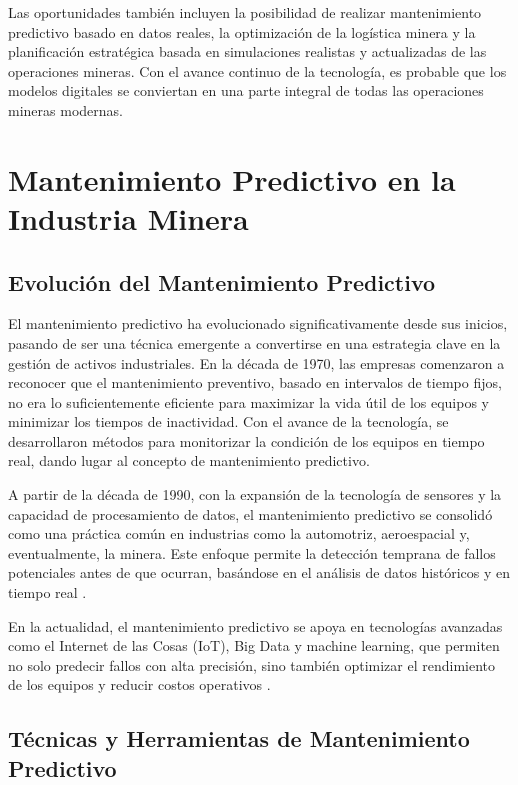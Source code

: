 Las oportunidades también incluyen la posibilidad de realizar mantenimiento predictivo basado en datos reales, la optimización de la logística minera y la planificación estratégica basada en simulaciones realistas y actualizadas de las operaciones mineras. Con el avance continuo de la tecnología, es probable que los modelos digitales se conviertan en una parte integral de todas las operaciones mineras modernas.


\section{Mantenimiento Predictivo en la Industria Minera}

\subsection{Evolución del Mantenimiento Predictivo}

El mantenimiento predictivo ha evolucionado significativamente desde sus inicios, pasando de ser una técnica emergente a convertirse en una estrategia clave en la gestión de activos industriales. En la década de 1970, las empresas comenzaron a reconocer que el mantenimiento preventivo, basado en intervalos de tiempo fijos, no era lo suficientemente eficiente para maximizar la vida útil de los equipos y minimizar los tiempos de inactividad. Con el avance de la tecnología, se desarrollaron métodos para monitorizar la condición de los equipos en tiempo real, dando lugar al concepto de mantenimiento predictivo.

A partir de la década de 1990, con la expansión de la tecnología de sensores y la capacidad de procesamiento de datos, el mantenimiento predictivo se consolidó como una práctica común en industrias como la automotriz, aeroespacial y, eventualmente, la minera. Este enfoque permite la detección temprana de fallos potenciales antes de que ocurran, basándose en el análisis de datos históricos y en tiempo real \cite{mobley2002predictive}.

En la actualidad, el mantenimiento predictivo se apoya en tecnologías avanzadas como el Internet de las Cosas (IoT), Big Data y machine learning, que permiten no solo predecir fallos con alta precisión, sino también optimizar el rendimiento de los equipos y reducir costos operativos \cite{lee2014predictive}.

\subsection{Técnicas y Herramientas de Mantenimiento Predictivo}

